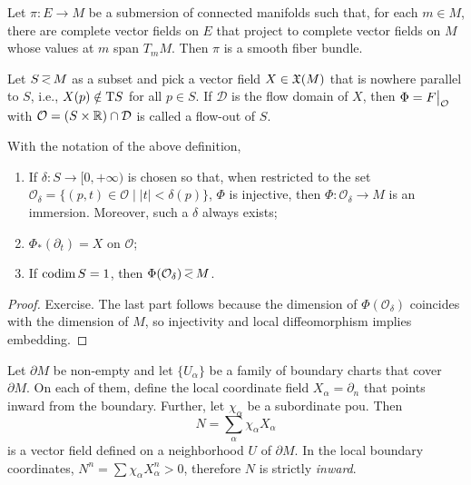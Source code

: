 \begin{cor}[Ehresmann (1961)]\label{thm Ehresmann vector fields}
    Let $\pi:E\to M$ be a submersion of connected manifolds such that, for each $m\in M$, there are complete vector fields on $E$ that project to complete vector fields on $M$ whose values at $m$ span $T_m M$. Then $\pi$ is a smooth fiber bundle.
\end{cor}



\begin{defn}
    Let $S\emb M$ as a subset and pick a vector field $X\in\mathfrak{X}(M)$ that is nowhere parallel to $S$, i.e., $X(p)\notin \mathrm{T} S$ for all $p\in S$. If $\mathcal{D}$ is the flow domain of $X$, then $\Phi=\restr{F}{\mathcal{O}}$ with $\mathcal{O}=(S\times\mathbb{R} )\cap \mathcal{D}$ is called a flow-out of $S$.
\end{defn}

\begin{thm}
    With the notation of the above definition,
    \begin{enumerate}
        \item If $\delta:S\to [0,+\infty)$ is chosen so that, when restricted to the set $\mathcal{O}_\delta=\{(p,t)\in\mathcal{O}\mid |t|<\delta(p)\}$, $\Phi$ is injective, then $\Phi:\mathcal{O}_\delta\to M$ is an immersion. Moreover, such a $\delta$ always exists;
        \item $\Phi_\ast (\partial_t)=X$ on $\mathcal{O}$;
        \item If $\operatorname{codim} S=1$, then $\Phi(\mathcal{O}_\delta)\emb M$.
    \end{enumerate}
\end{thm}
\begin{proof}
    Exercise. The last part follows because the dimension of $\Phi(\mathcal{O}_\delta)$ coincides with the dimension of $M$, so injectivity and local diffeomorphism implies embedding.
\end{proof}

Let $\partial M$ be non-empty and let $\{U_\alpha\}$ be a family of boundary charts that cover $\partial M$. On each of them, define the local coordinate field $X_\alpha=\partial_n$ that points inward from the boundary. Further, let $\chi_\alpha$ be a subordinate \gls{pou}. Then 
\[N=\sum_\alpha \chi_\alpha X_\alpha\]
is a vector field defined on a neighborhood $U$ of $\partial M$. In the local boundary coordinates, $N^n=\sum \chi_\alpha X_\alpha^n>0$, therefore $N$ is strictly \emph{inward}.


